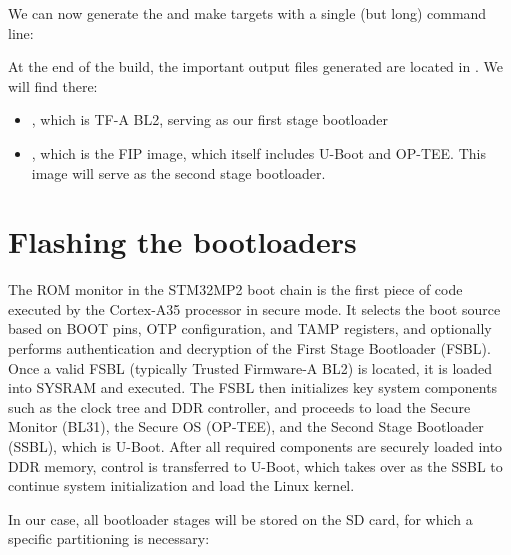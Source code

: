 We can now generate the  and  make targets with a
single (but long) command line:


At the end of the build, the important output files generated are
located in . We will find there:

\begin{itemize}

\item \code{tf-a-stm32mp257f-dk.stm32}, which is TF-A BL2, serving as
  our first stage bootloader

\item \code{fip.bin}, which is the FIP image, which itself includes
  U-Boot and OP-TEE. This image will serve as the second stage
  bootloader.

\end{itemize}

\section{Flashing the bootloaders}

The ROM monitor in the STM32MP2 boot chain is the first piece of code
executed by the Cortex-A35 processor in secure mode. It selects the
boot source based on BOOT pins, OTP configuration, and TAMP registers,
and optionally performs authentication and decryption of the First
Stage Bootloader (FSBL). Once a valid FSBL (typically Trusted
Firmware-A BL2) is located, it is loaded into SYSRAM and executed. The
FSBL then initializes key system components such as the clock tree and
DDR controller, and proceeds to load the Secure Monitor (BL31), the
Secure OS (OP-TEE), and the Second Stage Bootloader (SSBL), which is
U-Boot. After all required components are securely loaded into DDR
memory, control is transferred to U-Boot, which takes over as the SSBL
to continue system initialization and load the Linux kernel.

In our case, all bootloader stages will be stored on the SD card, for
which a specific partitioning is necessary:


